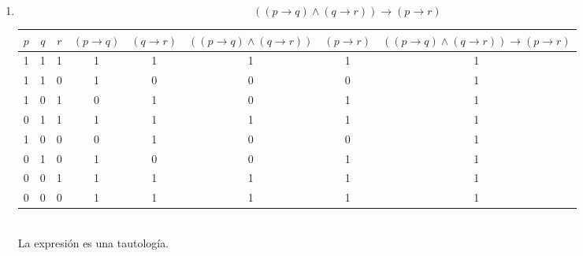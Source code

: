 \documentclass[11pt]{utalcaDoc}
\begin{document}
\begin{enumerate}
\item
\[ ((p \to q) \wedge (q \to r)) \to (p \to r)\]
\begin{tabular}{|c|c|c||c|c|c|c|c|}
\hline
$p$ & $q$ & $r$ & $(p \to q)$ & $(q \to r)$ & $((p \to q) \wedge (q \to r))$ & $(p \to r)$ & $((p \to q) \wedge (q \to r)) \to (p \to r)$ \\
\hline 
1 & 1 & 1 & 1 & 1 & 1 & 1 & 1 \\ 
\hline 
1 & 1 & 0 & 1 & 0 & 0 & 0 & 1 \\ 
\hline 
1 & 0 & 1 & 0 & 1 & 0 & 1 & 1 \\ 
\hline 
0 & 1 & 1 & 1 & 1 & 1 & 1 & 1 \\ 
\hline 
1 & 0 & 0 & 0 & 1 & 0 & 0 & 1 \\ 
\hline 
0 & 1 & 0 & 1 & 0 & 0 & 1 & 1 \\ 
\hline 
0 & 0 & 1 & 1 & 1 & 1 & 1 & 1 \\ 
\hline 
0 & 0 & 0 & 1 & 1 & 1 & 1 & 1 \\ 
\hline 
\end{tabular} \\ 
La expresión es una tautología.



\end{enumerate}
\newpage
\end{document}
